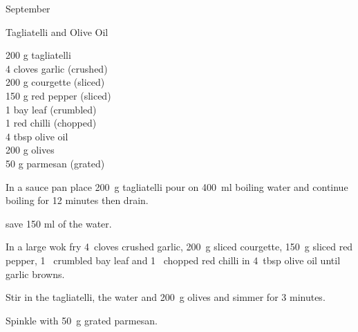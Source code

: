 \begin{menu}{September}
    \begin{recipe}{1}{Tagliatelli and Olive Oil}%
		\begin{ingredients}
		200 g tagliatelli  \\
	4 cloves garlic (crushed) \\
	200 g courgette (sliced) \\
	150 g red pepper (sliced) \\
	1  bay leaf (crumbled) \\
	1  red chilli (chopped) \\
	4 tbsp olive oil  \\
	200 g olives  \\
	50 g parmesan (grated) \\
	
		\end{ingredients}
	
	
    \begin{instructions}
    \item 
    In a
    sauce pan
    place
    200~g  tagliatelli
    pour on
    400~ml  boiling water and continue boiling for 12 minutes then drain.
  
        save 150 ml of the water.
      \item 
        In a large wok fry
        4~cloves crushed garlic,
        200~g sliced courgette,
        150~g sliced red pepper,
        1~ crumbled bay leaf
        and
        1~ chopped red chilli
        in
        4~tbsp  olive oil
        until garlic browns.
      \item 
        Stir in the tagliatelli,
        the water
        and
        200~g  olives
        and simmer for 3 minutes.
      \item 
        Spinkle with
        50~g grated parmesan.
      
    \end{instructions}
    \end{recipe}%
  
    \clearpage
    \end{menu}
	
